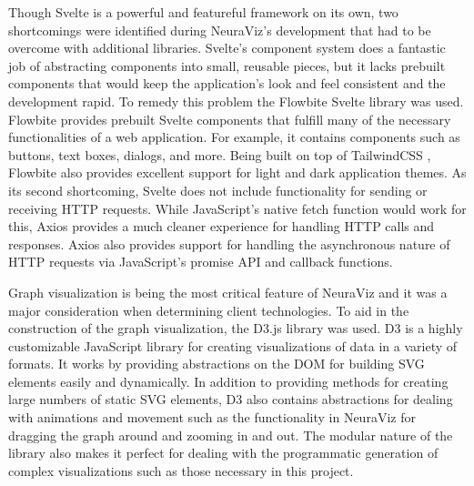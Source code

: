 Though Svelte is a powerful and featureful framework on its own, two shortcomings were identified during NeuraViz's development that had to be overcome with additional libraries. Svelte's component system does a fantastic job of abstracting components into small, reusable pieces, but it lacks prebuilt components that would keep the application's look and feel consistent and the development rapid. To remedy this problem the Flowbite Svelte library \cite{flowbite} was used. Flowbite provides prebuilt Svelte components that fulfill many of the necessary functionalities of a web application. For example, it contains components such as buttons, text boxes, dialogs, and more. Being built on top of TailwindCSS \cite{tailwind}, Flowbite also provides excellent support for light and dark application themes. As its second shortcoming, Svelte does not include functionality for sending or receiving HTTP requests. While JavaScript's native fetch function would work for this, Axios \cite{axios} provides a much cleaner experience for handling HTTP calls and responses. Axios also provides support for handling the asynchronous nature of HTTP requests via JavaScript's promise API and callback functions.

Graph visualization is being the most critical feature of NeuraViz and it was a major consideration when determining client technologies. To aid in the construction of the graph visualization, the D3.js library \cite{d3} was used. D3 is a highly customizable JavaScript library for creating visualizations of data in a variety of formats. It works by providing abstractions on the DOM for building SVG elements easily and dynamically. In addition to providing methods for creating large numbers of static SVG elements, D3 also contains abstractions for dealing with animations and movement such as the functionality in NeuraViz for dragging the graph around and zooming in and out. The modular nature of the library also makes it perfect for dealing with the programmatic generation of complex visualizations such as those necessary in this project.

